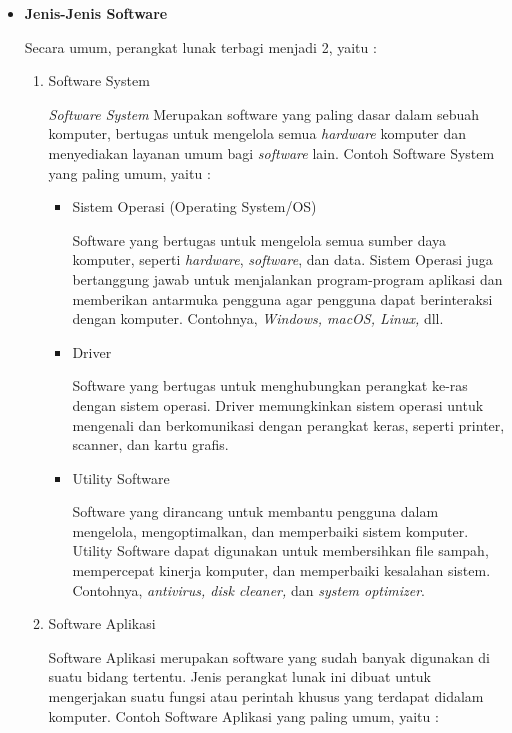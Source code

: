 \documentclass[12pt]{article}
\begin{document}
\begin{itemize}
        \item \textbf{Jenis-Jenis Software}
        \par
        Secara umum, perangkat lunak terbagi menjadi 2, yaitu :
        \begin{enumerate}
            \item Software System
            \par
            \textit{Software System} Merupakan software yang paling dasar dalam sebuah komputer, bertugas untuk mengelola semua \textit{hardware} komputer dan menyediakan layanan umum bagi \textit{software} lain. Contoh Software System yang paling umum, yaitu :
            \begin{itemize}
                \item Sistem Operasi (Operating System/OS)
                \par
                Software yang bertugas untuk mengelola semua sumber daya komputer, seperti \textit{hardware}, \textit{software}, dan data. Sistem Operasi juga bertanggung jawab untuk menjalankan program-program aplikasi dan memberikan antarmuka pengguna agar pengguna dapat berinteraksi dengan komputer. Contohnya, \textit{Windows, macOS, Linux,} dll.
                \item Driver
                \par 
                Software yang bertugas untuk menghubungkan perangkat ke-ras dengan sistem operasi. 
                Driver memungkinkan sistem operasi untuk mengenali dan berkomunikasi dengan perangkat keras, seperti printer, scanner, dan kartu grafis.
                \item Utility Software
                \par
                Software yang dirancang untuk membantu pengguna dalam mengelola, mengoptimalkan, dan memperbaiki sistem komputer. Utility Software dapat digunakan untuk membersihkan file sampah, mempercepat kinerja komputer, dan memperbaiki kesalahan sistem. Contohnya, \textit{antivirus, disk cleaner,} dan \textit{system optimizer}.
            \end{itemize} 
            \item Software Aplikasi
            \par
            Software Aplikasi merupakan software yang sudah banyak digunakan di suatu bidang tertentu. Jenis perangkat lunak ini dibuat untuk mengerjakan suatu fungsi atau perintah khusus yang terdapat didalam komputer. Contoh Software Aplikasi yang paling umum, yaitu :
            \begin{itemize}

\end{itemize}
\end{enumerate}
\end{itemize}
\end{document}
